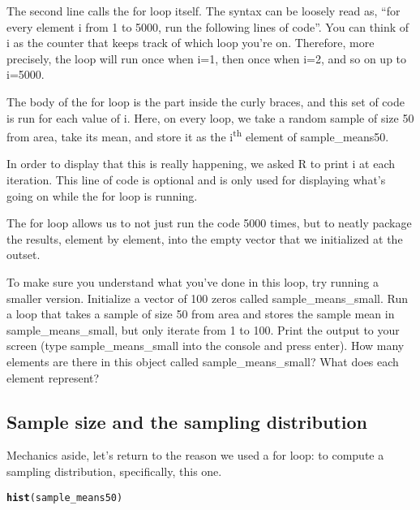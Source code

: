 \documentclass{article}\usepackage[]{graphicx}\usepackage[]{color}
\makeatletter
\newcommand{\hlnum}[1]{\textcolor[rgb]{0.686,0.059,0.569}{#1}}%
\newcommand{\hlopt}[1]{\textcolor[rgb]{0,0,0}{#1}}%
\newcommand{\hlstd}[1]{\textcolor[rgb]{0.345,0.345,0.345}{#1}}%
\newcommand{\hlkwd}[1]{\textcolor[rgb]{0.737,0.353,0.396}{\textbf{#1}}}%
\newenvironment{kframe}{%
 \def\at@end@of@kframe{}%
 \ifinner\ifhmode%
  \def\at@end@of@kframe{\end{minipage}}%
  \begin{minipage}{\columnwidth}%
 \fi\fi%
 \def\FrameCommand##1{\hskip\@totalleftmargin \hskip-\fboxsep
 \colorbox{shadecolor}{##1}\hskip-\fboxsep
     \hskip-\linewidth \hskip-\@totalleftmargin \hskip\columnwidth}%
 \MakeFramed {\advance\hsize-\width
   \@totalleftmargin\z@ \linewidth\hsize
   \@setminipage}}%
 {\par\unskip\endMakeFramed%
 \at@end@of@kframe}
\newenvironment{knitrout}{}{} %
\makeatother
\begin{document}
The second line calls the for loop itself.  The syntax can be loosely read as, ``for every element \hlstd{i} from 1 to 5000, run the following lines of code''. You can think of \hlstd{i} as the counter that keeps track of which loop you're on. Therefore, more precisely, the loop will run once when \hlstd{i}\hlopt{=}\hlnum{1}, then once when \hlstd{i}\hlopt{=}\hlnum{2}, and so on up to \hlstd{i}\hlopt{=}\hlnum{5000}.

The body of the for loop is the part inside the curly braces, and this set of code is run for each value of \hlstd{i}.  Here, on every loop, we take a random sample of size 50 from \hlstd{area}, take its mean, and store it as the \hlstd{i}\textsuperscript{th} element of \hlstd{sample\_means50}.

In order to display that this is really happening, we asked R to print \hlstd{i} at each iteration. This line of code is optional and is only used for displaying what's going on while the for loop is running.

The for loop allows us to not just run the code 5000 times, but to neatly package the results, element by element, into the empty vector that we initialized at the outset. 

\begin{exercise}
To make sure you understand what you've done in this loop, try running a smaller version.  Initialize a vector of 100 zeros called \hlstd{sample\_means\_small}.  Run a loop that takes a sample of size 50 from \hlstd{area} and stores the sample mean in \hlstd{sample\_means\_small}, but only iterate from 1 to 100.  Print the output to your screen (type \hlstd{sample\_means\_small} into the console and press enter).  How many elements are there in this object called \hlstd{sample\_means\_small}? What does each element represent?
\end{exercise}

\subsection*{Sample size and the sampling distribution}
Mechanics aside, let's return to the reason we used a for loop: to compute a sampling distribution, specifically, this one.

\begin{knitrout}
\color{fgcolor}\begin{kframe}
\begin{alltt}
\hlkwd{hist}\hlstd{(sample_means50)}
\end{alltt}
\end{kframe}
\end{knitrout}
\end{document}
